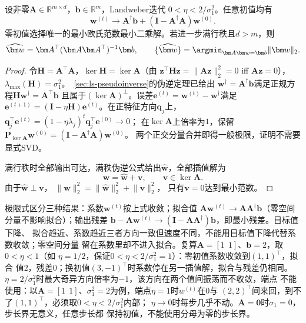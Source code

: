 \begin{theorem}[最小二乘梯度迭代的解选择]
\label{thm:gradient-descent-minimum-norm}
设非零$\bm A\in\mathbb R^{m\times d}$，$\bm b\in\mathbb R^m$，Landweber迭代
$0<\eta<2/\sigma_1^2$。任意初值均有
\begin{equation}
 \bm w^{(t)}\longrightarrow
 \bm A^\dagger\bm b+(\bm I-\bm A^\dagger\bm A)\bm w^{(0)}.
 \label{eq:matrix-analysis-gradient-limit}
\end{equation}
零初值选择唯一的最小欧氏范数最小二乘解。若进一步满行秩且$d>m$，则
\begin{equation}
 \widehat{\bm w}=\bm A^{\top}(\bm A\bm A^{\top})^{-1}\bm b,\qquad
 \{\widehat{\bm w}\}=\argmin_{\bm A\bm w=\bm b}\lVert\bm w\rVert_2.
 \label{eq:minimum-norm-interpolator}
\end{equation}
\end{theorem}
\begin{proof}
令$\bm H=\bm A^{\top}\bm A$，$\ker\bm H=\ker\bm A$（由
$\bm z^{\top}\bm H\bm z=\lVert\bm A\bm z\rVert_2^2=0$ iff $\bm A\bm z=0$），
$\lambda_{\max}(\bm H)=\sigma_1^2$。~\ref{sec:ls-pseudoinverse}的伪逆定理已给出
$\bm w^\dagger=\bm A^\dagger\bm b$满足正规方程$\bm H\bm w^\dagger=\bm A^{\top}\bm b$
且属于$(\ker\bm A)^\perp$。误差$\bm e^{(t)}=\bm w^{(t)}-\bm w^\dagger$满足
$\bm e^{(t+1)}=(\bm I-\eta\bm H)\bm e^{(t)}$。在正特征方向$\bm q_j$上，
$\bm q_j^{\top}\bm e^{(t)}=(1-\eta\lambda_j)^t\bm q_j^{\top}\bm e^{(0)}\to0$；
在$\ker\bm A$上倍率为$1$，保留
$\bm P_{\ker\bm A}\bm w^{(0)}=(\bm I-\bm A^\dagger\bm A)\bm w^{(0)}$。
两个正交分量合并即得一般极限，证明不需要显式SVD。

满行秩时全部输出可达，满秩伪逆公式给出$\widehat{\bm w}$，全部插值解为
\begin{equation}
 \bm w=\widehat{\bm w}+\bm v,\qquad \bm v\in\ker\bm A.
 \label{eq:interpolator-decomposition}
\end{equation}
由于$\widehat{\bm w}\perp\bm v$，
$\lVert\bm w\rVert_2^2=\lVert\widehat{\bm w}\rVert_2^2+\lVert\bm v\rVert_2^2$，
只有$\bm v=0$达到最小范数。
\end{proof}

极限式区分三种结果：系数$\bm w^{(t)}$按上式收敛；拟合值
$\bm A\bm w^{(t)}\to\bm A\bm A^\dagger\bm b$（零空间分量不影响拟合）；输出残差
$\bm b-\bm A\bm w^{(t)}\to(\bm I-\bm A\bm A^\dagger)\bm b$，即最小残差。目标值下降、
拟合趋近、系数趋近三者方向一致但速度不同，不能用目标值下降代替系数收敛；零空间分量
留在系数里却不进入拟合。复算$\bm A=[1\ \ 1]$、$\bm b=2$，取$0<\eta<1$（如
$\eta=1/2$，保证$0<\eta<2/\sigma_1^2=1$）：零初值系数收敛到$(1,1)^{\top}$，拟合
值$2$，残差$0$；换初值$(3,-1)^{\top}$时系数停在另一插值解，拟合与残差仍相同。
$\eta=2/\sigma_1^2$时最大奇异方向倍率为$-1$，该方向在两个值间振荡而不收敛，端点
不能使用：以$\bm A=[1\ \ 1]$、$\sigma_1^2=2$为例，端点$\eta=1$时$w^{(t)}$在$0$与
$(2,2)^{\top}$间来回，到不了$(1,1)^{\top}$，必须取$0<\eta<2/\sigma_1^2$内部；
$\eta\to0$时每步几乎不动。$\bm A=\bm0$时$\sigma_1=0$，步长界无意义，任意步长都
保持初值，不能使用分母为零的步长界。

